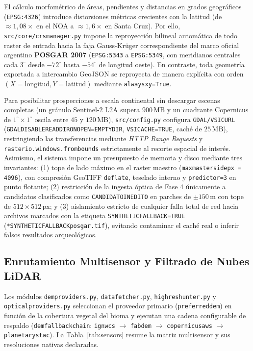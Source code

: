 \documentclass[11pt,a4paper]{article}
\DeclareRobustCommand{\_}{\ifmmode\mbox{\textunderscore}\else\textunderscore\allowbreak\fi}
\begin{document}
El c\'alculo morfom\'etrico de \'areas, pendientes y distancias en grados geogr\'aficos (\texttt{EPSG:4326}) introduce distorsiones m\'etricas crecientes con la latitud (de $\approx 1{,}08\times$ en el NOA a $\approx 1{,}6\times$ en Santa Cruz). Por ello, \texttt{src/core/crs\_manager.py} impone la reproyecci\'on bilineal autom\'atica de todo raster de entrada hacia la faja Gauss-Kr\"uger correspondiente del marco oficial argentino \textbf{POSGAR 2007} (\texttt{EPSG:5343} a \texttt{EPSG:5349}, con meridianos centrales cada $3^\circ$ desde $-72^\circ$ hasta $-54^\circ$ de longitud oeste). En contraste, toda geometr\'ia exportada a intercambio GeoJSON se reproyecta de manera explícita con orden $(X=\text{longitud}, Y=\text{latitud})$ mediante \texttt{always\_xy=True}.

Para posibilitar prospecciones a escala continental sin descargar escenas completas (un gr\'anulo Sentinel-2 L2A supera $900\,\mathrm{MB}$ y un cuadrante Copernicus de $1^\circ\times 1^\circ$ oscila entre $45$ y $120\,\mathrm{MB}$), \texttt{src/config.py} configura \texttt{GDAL/VSICURL} (\texttt{GDAL\_DISABLE\_READDIR\_ON\_OPEN=\textquotedbl{}EMPTY\_DIR\textquotedbl{}}, \texttt{VSI\_CACHE=\textquotedbl{}TRUE\textquotedbl{}}, cach\'e de $25\,\mathrm{MB}$), restringiendo las transferencias mediante \emph{HTTP Range Requests} y \texttt{rasterio.windows.from\_bounds} estrictamente al recorte espacial de inter\'es. Asimismo, el sistema impone un presupuesto de memoria y disco mediante tres invariantes: (1) tope de lado m\'aximo en el raster maestro (\texttt{max\_master\_side\_px = 4096}), con compresi\'on GeoTIFF \texttt{deflate}, teselado interno y \texttt{predictor=3} en punto flotante; (2) restricci\'on de la ingesta \'optica de Fase 4 \'unicamente a candidatos clasificados como \texttt{CANDIDATO\_INEDITO} en parches de $\pm 150\,\mathrm{m}$ con tope de $512\times 512\,\mathrm{px}$; y (3) aislamiento estricto de cualquier falla total de red hacia archivos marcados con la etiqueta \texttt{SYNTHETIC\_FALLBACK=\textquotedbl{}TRUE\textquotedbl{}} (\texttt{*\_SYNTHETIC\_FALLBACK\_posgar\_*.tif}), evitando contaminar el cach\'e real o inferir falsos resultados arqueol\'ogicos.

\subsection{Enrutamiento Multisensor y Filtrado de Nubes LiDAR}

Los m\'odulos \texttt{dem\_providers.py}, \texttt{data\_fetcher.py}, \texttt{highres\_hunter.py} y \texttt{optical\_providers.py} seleccionan el proveedor primario (\texttt{preferred\_dem}) en funci\'on de la cobertura vegetal del bioma y ejecutan una cadena configurable de respaldo (\texttt{dem\_fallback\_chain}: \texttt{ign\_wcs} $\rightarrow$ \texttt{fabdem} $\rightarrow$ \texttt{copernicus\_aws} $\rightarrow$ \texttt{planetary\_stac}). La Tabla~\ref{tab:sensors} resume la matriz multisensor y sus resoluciones nativas declaradas.
\end{document}
